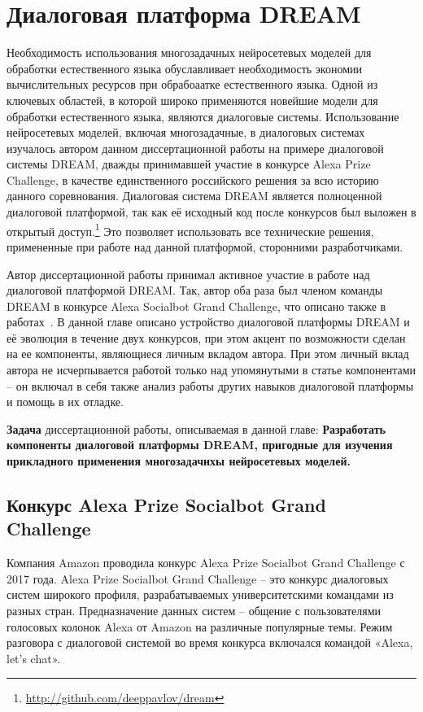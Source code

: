 
\chapter{Диалоговая платформа DREAM}\label{ch:dream} 
Необходимость использования многозадачных нейросетевых моделей для обработки естественного языка обуславливает необходимость экономии вычислительных ресурсов при обрабоаатке естественного языка. Одной из ключевых областей, в которой широко применяются новейшие модели для обработки естественного языка, являются диалоговые системы.  Использование нейросетевых моделей, включая многозадачные, в диалоговых системах изучалось автором данном диссертационной работы на примере диалоговой системы DREAM, дважды принимавшей участие в конкурсе Alexa Prize Challenge, в качестве единственного российского решения за всю историю данного соревнования. Диалоговая система {DREAM} является полноценной диалоговой платформой, так как её исходный код после конкурсов был выложен в открытый доступ.\footnote{\url{http://github.com/deeppavlov/dream}} Это позволяет использовать все технические решения, примененные при работе над данной платформой, сторонними разработчиками.

Автор диссертационной работы принимал активное участие в работе над диалоговой платформой DREAM. Так, автор оба раза был членом команды {DREAM} в конкурсе Alexa Socialbot Grand Challenge, что описано также в работах~\cite{dream1,dream1_trudy,dream2}. В данной главе описано устройство диалоговой платформы {DREAM} и её эволюция в течение двух конкурсов, при этом акцент по возможности сделан на ее компоненты, являющиеся личным вкладом автора. При этом личный вклад автора не исчерпывается работой только над упомянутыми в статье компонентами -- он включал в себя также анализ работы других навыков диалоговой платформы и помощь в их отладке.

\textbf{Задача} диссертационной работы, описываемая в данной главе: \textbf{Разработать компоненты диалоговой платформы DREAM, пригодные для изучения прикладного применения многозадачнхы нейросетевых моделей.}

\section{Конкурс Alexa Prize Socialbot Grand Challenge}

Компания Amazon проводила конкурс Alexa Prize Socialbot Grand Challenge с 2017 года. Alexa Prize Socialbot Grand Challenge -- это конкурс диалоговых систем широкого профиля, разрабатываемых университетскими командами из разных стран. Предназначение данных систем -- общение с пользователями голосовых колонок Alexa от Amazon на различные популярные темы. Режим разговора с диалоговой системой во время конкурса включался командой «Alexa, let’s chat».

